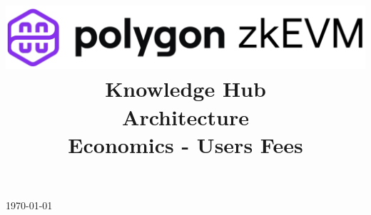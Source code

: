 \documentclass[preprint]{iacrtrans}
\title{
  \includegraphics[width=\columnwidth]{logo_zkEVM.png} \\ \vspace{0.3cm}
  Knowledge Hub \\ \vspace{0.3cm}
  Architecture \\ \vspace{0.3cm}
  Economics - Users Fees \vspace{0.3cm}\\
  \version
}
\institute{}
\theoremstyle{definition}
\begin{document}
\begin{titlepage}
\centering
\maketitle
\today
\end{titlepage}



\newpage



%
%

\newpage
\appendix
\end{document}
